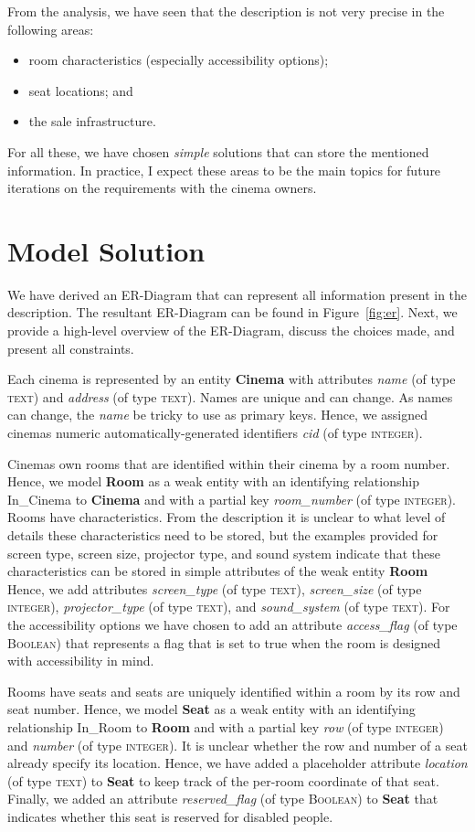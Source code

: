 \documentclass{article}
\newcommand{\ent}[1]{\textbf{#1}}
\newcommand{\attr}[1]{\emph{#1}}
\newcommand{\rel}[1]{\textsf{#1}}
\newcommand{\domain}[1]{(of type \textsc{#1})}
\begin{document}
From the analysis, we have seen that the description is not very precise in the following areas:
\begin{itemize}
\item room characteristics (especially accessibility options);
\item seat locations; and
\item the sale infrastructure.
\end{itemize}
For all these, we have chosen \emph{simple} solutions that can store the mentioned information. In practice, I expect these areas to be the main topics for future iterations on the requirements with the cinema owners.

\section*{Model Solution}
We have derived an ER-Diagram that can represent all information present in the description. The resultant ER-Diagram can be found in Figure~\ref{fig:er}. Next, we provide a high-level overview of the ER-Diagram, discuss the choices made, and present all constraints.

Each cinema is represented by an entity \ent{Cinema} with attributes \attr{name} \domain{text} and \attr{address} \domain{text}. Names are unique and can change. As names can change, the \attr{name} be tricky to use as primary keys. Hence, we assigned cinemas numeric automatically-generated identifiers \attr{cid} \domain{integer}.

Cinemas own rooms that are identified within their cinema by a room number. Hence, we model \ent{Room} as a weak entity with an identifying relationship \rel{In\_Cinema} to \ent{Cinema} and with a partial key \attr{room\_number} \domain{integer}. Rooms have characteristics. From the description it is unclear to what level of details these characteristics need to be stored, but the examples provided for screen type, screen size, projector type, and sound system indicate that these characteristics can be stored in simple attributes of the weak entity \ent{Room} Hence, we add attributes \attr{screen\_type} \domain{text}, \attr{screen\_size} \domain{integer}, \attr{projector\_type} \domain{text}, and \attr{sound\_system} \domain{text}. For the accessibility options we have chosen to add an attribute \attr{access\_flag} \domain{Boolean} that represents a flag that is set to true when the room is designed with accessibility in mind.

Rooms have seats and seats are uniquely identified within a room by its row and seat number. Hence, we model \ent{Seat} as a weak entity with an identifying relationship \rel{In\_Room} to \ent{Room} and with a partial key \attr{row} \domain{integer} and \attr{number} \domain{integer}. It is unclear whether the row and number of a seat already specify its location. Hence, we have added a placeholder attribute \attr{location} \domain{text} to \ent{Seat} to keep track of the per-room coordinate of that seat. Finally, we added an attribute \attr{reserved\_flag} \domain{Boolean} to \ent{Seat} that indicates whether this seat is reserved for disabled people.
\end{document}
